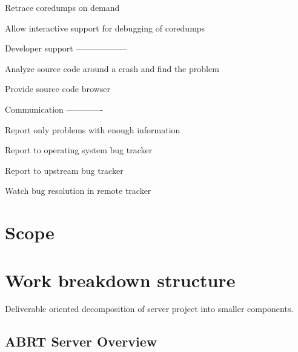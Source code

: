 \documentclass{article}
\begin{document}
Retrace coredumps on demand

Allow interactive support for debugging of coredumps


Developer support
------------------

Analyze source code around a crash and find the problem

Provide source code browser


Communication
-------------

Report only problems with enough information

Report to operating system bug tracker

Report to upstream bug tracker

Watch bug resolution in remote tracker


\section{Scope}

\section{Work breakdown structure}

Deliverable oriented decomposition of server project into smaller
components.

\subsection{ABRT Server Overview}
\end{document}
